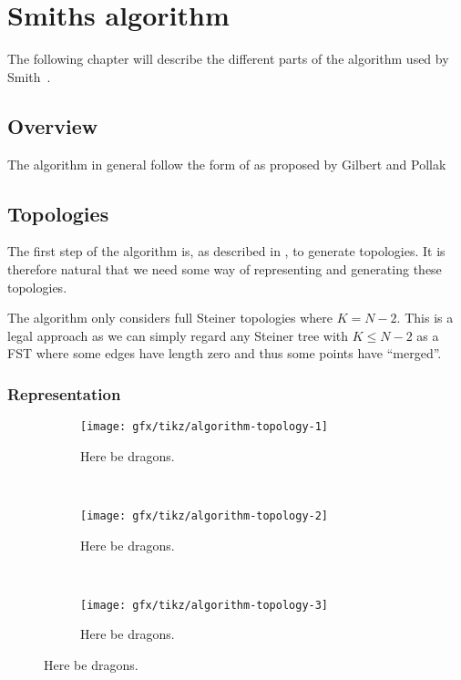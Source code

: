 \chapter{Smiths algorithm}
\label{ch:algorithm}

The following chapter will describe the different parts of the algorithm used by
Smith~\cite{Smith1992}. 

\section{Overview}
\label{sec:overview}

The algorithm in general follow the form of as proposed by Gilbert and
Pollak~



\section{Topologies}
\label{sec:topologies}

The first step of the algorithm is, as described in , to
generate topologies. It is therefore natural that we need some way of
representing and generating these topologies.

The algorithm only considers full Steiner topologies where $K = N - 2$. This is
a  legal approach as we can simply
regard any Steiner tree with $K \le N - 2$ as a \ac{FST} where some edges have
length zero and thus some points have ``merged''.

\subsection{Representation}
\label{sec:representation}

\begin{figure}[htbp]
\centering
  \begin{subfigure}[b]{0.3\textwidth}
    \texttt{[image: gfx/tikz/algorithm-topology-1]}
    \caption{Here be dragons.\label{fig:algorithm-topology-1}}
  \end{subfigure}
~
  \begin{subfigure}[b]{0.3\textwidth}
    \texttt{[image: gfx/tikz/algorithm-topology-2]}
    \caption{Here be dragons.\label{fig:algorithm-topology-2}}
  \end{subfigure}
~
  \begin{subfigure}[b]{0.3\textwidth}
    \texttt{[image: gfx/tikz/algorithm-topology-3]}
    \caption{Here be dragons.\label{fig:algorithm-topology-3}}
  \end{subfigure}
\caption[How to construct Steiner topologies]{Here be dragons.\label{fig:algorithm-topologies}}
\end{figure}

